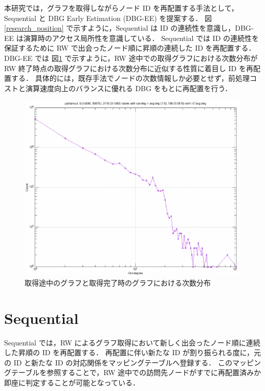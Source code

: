 本研究では，グラフを取得しながらノード ID を再配置する手法として，Sequential と DBG Early Estimation (DBG-EE) を提案する．
図\ref{research_position} で示すように，Sequential は ID の連続性を意識し，DBG-EE は演算時のアクセス局所性を意識している．
Sequential では ID の連続性を保証するために RW で出会ったノード順に昇順の連続した ID を再配置する．
DBG-EE では 図\ref{degree_appro} で示すように，RW 途中での取得グラフにおける次数分布が RW 終了時点の取得グラフにおける次数分布に近似する性質に着目し ID を再配置する．
具体的には，既存手法でノードの次数情報しか必要とせず，前処理コストと演算速度向上のバランスに優れる DBG \cite{faldu2019closer} をもとに再配置を行う．
\begin{figure}[t]
  \centering
  \includegraphics[width=12cm]{./figure/degree_appro.pdf}
  \caption{取得途中のグラフと取得完了時のグラフにおける次数分布}
  \label{degree_appro}
\end{figure}
\section{Sequential}
Sequential では，RW によるグラフ取得において新しく出会ったノード順に連続した昇順の ID を再配置する．
再配置に伴い新たな ID が割り振られる度に，元の ID と新たな ID の対応関係をマッピングテーブルへ登録する．
このマッピングテーブルを参照することで，RW 途中での訪問先ノードがすでに再配置済みか即座に判定することが可能となっている．

